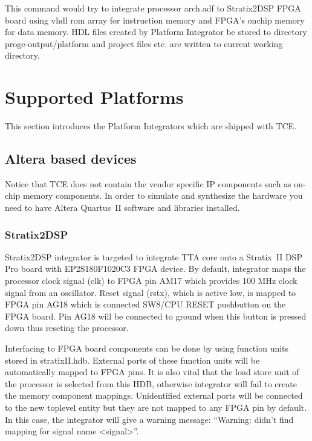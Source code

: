 \documentclass[twoside]{tceusermanual}
\begin{document}
This command would try to integrate processor arch.adf to Stratix2DSP FPGA
board using vhdl rom array for instruction memory and FPGA's onchip memory for
data memory. HDL files created by Platform Integrator be stored to directory
proge-output/platform and project files etc. are written to current working
directory.

\section{Supported Platforms}

This section introduces the Platform Integrators which are shipped with TCE.

\subsection{Altera based devices}

Notice that TCE does not contain the vendor specific IP components such as
on-chip memory components. In order to simulate and synthesize the hardware
you need to have Altera Quartus~II software and libraries installed.

\subsubsection{Stratix2DSP}
\label{stratix2dspIntegrator}

Stratix2DSP integrator is targeted to integrate TTA core onto a
Stratix~II DSP Pro board with EP2S180F1020C3 FPGA device. By default,
integrator maps the processor clock signal (clk) to FPGA pin AM17
which provides 100 MHz clock signal from an oscillator. Reset signal
(rstx), which is active low, is mapped to FPGA pin AG18 which is
connected SW8/CPU RESET pushbutton on the FPGA board. Pin AG18 will be
connected to ground when this button is pressed down thus reseting the
processor.

Interfacing to FPGA board components can be done by using function units
stored in stratixII.hdb. External ports of these function units will be
automatically mapped to FPGA pins. It is also vital that the load store unit
of the processor is selected from this HDB, otherwise integrator will fail to
create the memory component mappings. Unidentified external ports will be connected
to the new toplevel entity but they are not mapped to any FPGA pin by default.
In this case, the integrator will give a warning message: ``Warning: didn't find
mapping for signal name <signal>''.
\end{document}
